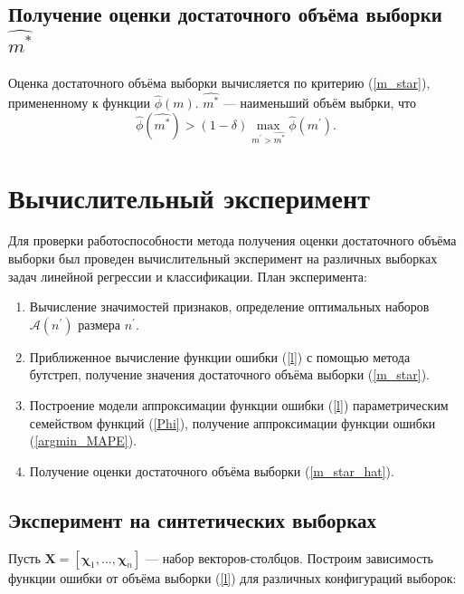 \documentclass[12pt, a4paper]{scrartcl}
\theoremstyle{plain}
\theoremstyle{definition}
\begin{document}
\subsection{Получение оценки достаточного объёма выборки $\hat{m^*}$}

Оценка достаточного объёма выборки вычисляется по критерию (\ref{m_star}), примененному к функции $\hat{\phi}(m)$. $\hat{m^*}$ --- наименьший объём выбрки, что
\begin{equation}\label{m_star_hat}
\hat{\phi}(\hat{m^*}) > (1 - \delta)\max\limits_{m^{\prime} > \hat{m^*}}\hat{\phi}(m^{\prime}).
\end{equation}

\newpage
\section{Вычислительный эксперимент}

Для проверки работоспособности метода получения оценки достаточного объёма выборки был проведен вычислительный эксперимент на различных выборках задач линейной регрессии и классификации. План эксперимента:

\begin{enumerate}
	\item Вычисление значимостей признаков, определение оптимальных наборов $\mathcal{A}(n^{\prime})$ размера $n^{\prime}$.
	\item Приближенное вычисление функции ошибки (\ref{l}) с помощью метода бутстреп, получение значения достаточного объёма выборки (\ref{m_star}).
	\item Построение модели аппроксимации функции ошибки (\ref{l}) параметрическим семейством функций (\ref{Phi}), получение аппроксимации функции ошибки (\ref{argmin_MAPE}).
	\item Получение оценки достаточного объёма выборки (\ref{m_star_hat}).
\end{enumerate}

\subsection{Эксперимент на синтетических выборках}

	Пусть $\mathbf{X} = [\boldsymbol{\chi}_1, ..., \boldsymbol{\chi}_n]$ --- набор векторов-столбцов. Построим зависимость функции ошибки от объёма выборки (\ref{l}) для различных конфигураций выборок:
\end{document}
